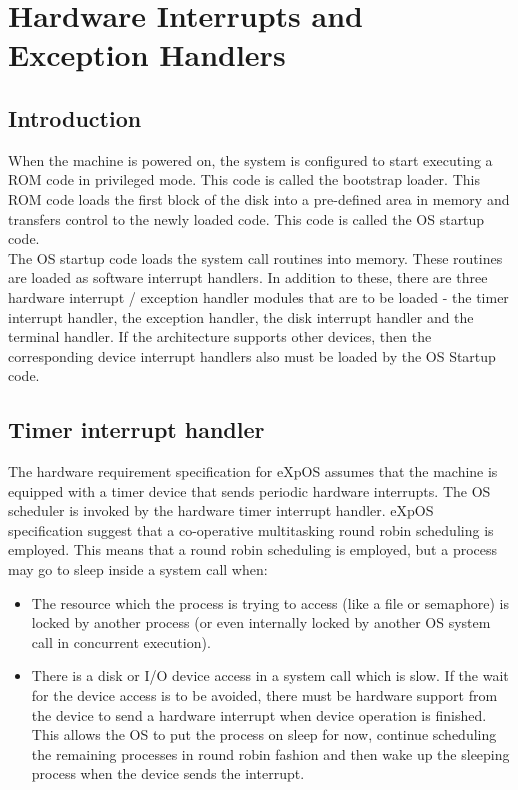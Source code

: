 \chapter{Hardware Interrupts and Exception Handlers}
\label{chap6}
\section{Introduction}
When the machine is powered on, the system is configured to start executing a ROM code in privileged mode. This code is called the bootstrap loader. This ROM code loads the first block of the disk into a pre-defined area in memory and transfers control to the newly loaded code. This code is called the OS startup code.
\\
The OS startup code loads the system call routines into memory. These routines are loaded as software interrupt handlers. In addition to these, there are three hardware interrupt / exception handler modules that are to be loaded - the timer interrupt handler, the exception handler, the disk interrupt handler and the terminal handler. If the architecture supports other devices, then the corresponding device interrupt handlers also must be loaded by the OS Startup code. 

\section{Timer interrupt handler}
The hardware requirement specification for eXpOS assumes that the machine is equipped with a timer device that sends periodic hardware interrupts. The OS scheduler is invoked by the hardware timer interrupt handler. eXpOS specification suggest that a co-operative multitasking round robin scheduling is employed. This means that a round robin scheduling is employed, but a process may go to sleep inside a system call when:
\begin{itemize}
\item The resource which the process is trying to access (like a file or semaphore) is locked by another process (or even internally locked by another OS system call in concurrent execution). 
\item There is a disk or I/O device access in a system call which is slow. If the wait for the device access is to be avoided, there must be hardware support from the device to send a hardware interrupt when device operation is finished. This allows the OS to put the process on sleep for now, continue scheduling the remaining processes in round robin fashion and then wake up the sleeping process when the device sends the interrupt. 
\end{itemize}

